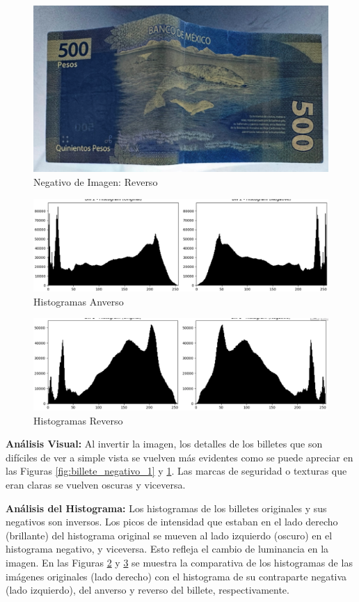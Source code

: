 \documentclass[12pt,letterpaper]{article}
\begin{document}
\begin{figure}[H]
  \centering
  \includegraphics[width=0.5\linewidth]{figuras/negativo2.png}
  \caption{Negativo de Imagen: Reverso}
  \label{fig:billete_negativo_2}
\end{figure}

\begin{figure}[H]
  \centering
  \includegraphics[width=0.5\linewidth]{figuras/histograma_negativo1.png}
  \caption{Histogramas Anverso}
  \label{fig:histograma_negativo1}
\end{figure}

\begin{figure}[H]
  \centering
  \includegraphics[width=0.5\linewidth]{figuras/histograma_negativo2.png}
  \caption{Histogramas Reverso}
  \label{fig:histograma_negativo2}
\end{figure}

\textbf{Análisis Visual:} Al invertir la imagen, los detalles de los billetes que son difíciles de ver a simple vista se vuelven más evidentes como se puede apreciar en las Figuras \ref{fig:billete_negativo_1} y \ref{fig:billete_negativo_2}. Las marcas de seguridad o texturas que eran claras se vuelven oscuras y viceversa.

\textbf{Análisis del Histograma:} Los histogramas de los billetes originales y sus negativos son inversos. Los picos de intensidad que estaban en el lado derecho (brillante) del histograma original se mueven al lado izquierdo (oscuro) en el histograma negativo, y viceversa. Esto refleja el cambio de luminancia en la imagen. En las Figuras \ref{fig:histograma_negativo1} y \ref{fig:histograma_negativo2} se muestra la comparativa de los histogramas de las imágenes originales (lado derecho) con el histograma de su contraparte negativa (lado izquierdo), del anverso y reverso del billete, respectivamente.
\end{document}
